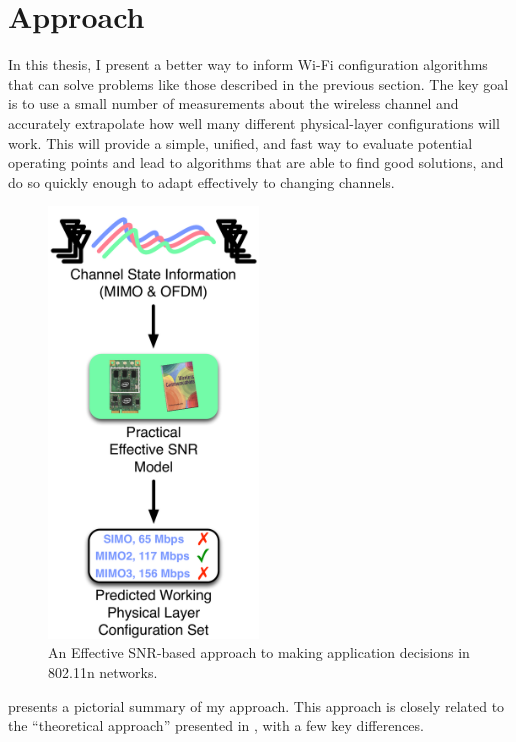 \section{Approach}
\label{sec:intro_approach}
In this thesis, I present a better way to inform Wi-Fi configuration algorithms that can solve problems like those described in the previous section. The key goal is to use a small number of measurements about the wireless channel and accurately extrapolate how well many different physical-layer configurations will work. This will provide a simple, unified, and fast way to evaluate potential operating points and lead to algorithms that are able to find good solutions, and do so quickly enough to adapt effectively to changing channels.

\begin{figure}[t]
	\centering
	\includegraphics[width=2.2in]{figures/selection_esnr}
	\caption[Effective SNR-based approach to making application decisions]{\label{fig:selection_esnr}An Effective SNR-based approach to making application decisions in 802.11n networks.}
\end{figure}

 presents a pictorial summary of my approach. This approach is closely related to the ``theoretical approach'' presented in , with a few key differences.

